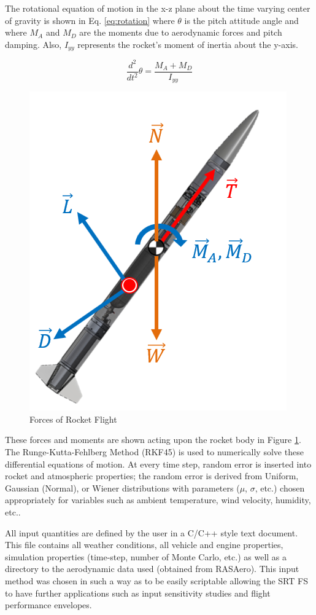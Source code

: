 \documentclass[10pt,a4paper]{article}
\begin{document}
The rotational equation of motion in the x-z plane about the time varying center of gravity is shown in Eq. \ref{eq:rotation} where $\theta$ is the pitch attitude angle and where $M_A$ and $M_D$ are the moments due to aerodynamic forces and pitch damping. Also, $I_{yy}$ represents the rocket's moment of inertia about the y-axis.

\begin{equation}
\frac{d^2}{dt^2}\theta = \frac{M_A+M_D}{I_{yy}}
\label{eq:rotation}
\end{equation}

\begin{figure}[h!]
	\centering
	\includegraphics[width=.3\textwidth]{./figs/rocket_force.png}
	\caption{Forces of Rocket Flight}
	\label{fig:rocket_force}
\end{figure}


These forces and moments are shown acting upon the rocket body in Figure \ref{fig:rocket_force}. The Runge-Kutta-Fehlberg Method (RKF45) is used to numerically solve these differential equations of motion. At every time step, random error is inserted into rocket and atmospheric properties; the random error is derived from Uniform, Gaussian (Normal), or Wiener distributions with parameters ($\mu$, $\sigma$, etc.) chosen appropriately for variables such as ambient temperature, wind velocity, humidity, etc..

All input quantities are defined by the user in a C/C++ style text document. This file contains all weather conditions, all vehicle and engine properties, simulation properties (time-step, number of Monte Carlo, etc.) as well as a directory to the aerodynamic data used (obtained from RASAero). This input method was chosen in such a way as to be easily scriptable allowing the SRT FS to have further applications such as input sensitivity studies and flight performance envelopes.
\end{document}

